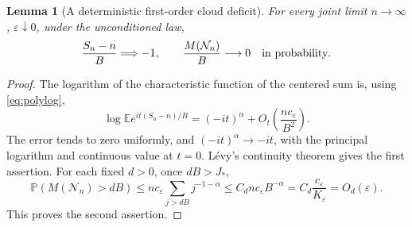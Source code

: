 \documentclass[11pt,a4paper]{article}
\newtheorem{lemma}[theorem]{Lemma}
\theoremstyle{definition}\newtheorem{definition}[theorem]{Definition}
\theoremstyle{remark}\newtheorem{remark}[theorem]{Remark}
\newcommand{\eps}{\varepsilon}
\newcommand{\Prob}{\mathbb P}
\newcommand{\E}{\mathbb E}
\newcommand{\1}{\mathbf 1}
\begin{document}
\begin{lemma}[A deterministic first-order cloud deficit]
\label{lem:cloudshift}
For every joint limit $n\to\infty$, $\eps\downarrow0$, under the
\emph{unconditioned} law,
\begin{equation}\label{eq:cloudshift}
 \frac{S_n-n}{B}\Longrightarrow-1,
 \qquad \frac{M(\mathcal N_n)}B\longrightarrow0
 \quad\hbox{in probability}.
\end{equation}
\end{lemma}
\begin{proof}
The logarithm of the characteristic function of the centered sum is,
using \eqref{eq:polylog},
\begin{equation}\label{eq:cloudcf}
 \log\E e^{it(S_n-n)/B}
 =(-it)^{\alpha}+O_t\left(\frac{nc_{\eps}}{B^2}\right).
\end{equation}
The error tends to zero uniformly, and $(-it)^{\alpha}\to-it$, with the
principal logarithm and continuous value at $t=0$. L\'evy's continuity
theorem gives the first assertion. For each fixed $d>0$, once $dB>J_*$,
\[
 \Prob(M(\mathcal N_n)>dB)
 \le n c_{\eps}\sum_{j>dB}j^{-1-\alpha}
 \le C_d n c_{\eps}B^{-\alpha}
 =C_d\frac{c_{\eps}}{K_{\eps}}=O_d(\eps).
\]
This proves the second assertion.
\end{proof}
\end{document}
